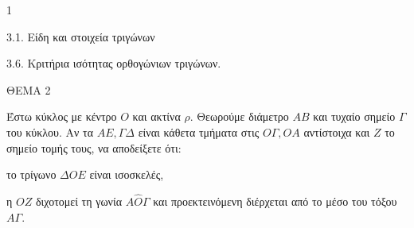 \begin{ylh}{1}
    \item 3.1. Είδη και στοιχεία τριγώνων
    \item 3.6. Κριτήρια ισότητας ορθογώνιων τριγώνων.
\end{ylh}

ΘΕΜΑ 2

Έστω κύκλος με κέντρο $O$ και ακτίνα $\rho$. Θεωρούμε διάμετρο $AB$ και τυχαίο σημείο $\Gamma$ του κύκλου. Αν τα $AE, \Gamma\Delta$ είναι κάθετα τμήματα στις $O\Gamma, OA$ αντίστοιχα και $Z$ το σημείο τομής τους, να αποδείξετε ότι:

\begin{alist}
\item το τρίγωνο $\Delta OE$ είναι ισοσκελές, 
\item η $OZ$ διχοτομεί τη γωνία $A\widehat{O}\Gamma$ και προεκτεινόμενη διέρχεται από το μέσο του τόξου $A\Gamma$. 

\begin{center}
\end{center}
\end{alist}
